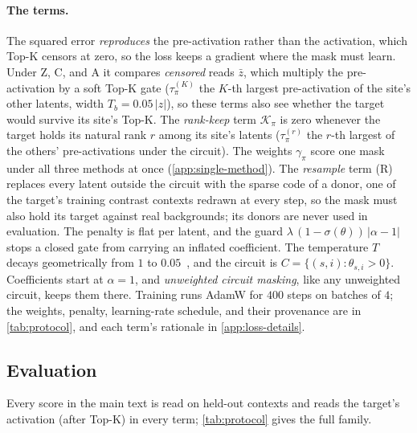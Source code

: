 \documentclass[10pt]{article}
\begin{document}
\paragraph{The terms.}
The squared error \emph{reproduces} the pre-activation rather than the activation, which Top-K censors at zero, so the loss keeps a gradient where the mask must learn.
Under Z, C, and A it compares \emph{censored} reads $\bar{z}$, which multiply the pre-activation by a soft Top-K gate ($\tau^{(K)}_{\pi}$ the $K$-th largest pre-activation of the site's other latents, width $T_b = 0.05\,\lvert z \rvert$), so these terms also see whether the target would survive its site's Top-K.
The \emph{rank-keep} term $\mathcal{K}_{\pi}$ is zero whenever the target holds its natural rank $r$ among its site's latents ($\tau^{(r)}_{\pi}$ the $r$-th largest of the others' pre-activations under the circuit).
The weights $\gamma_{\pi}$ score one mask under all three methods at once (\cref{app:single-method}).
The \emph{resample} term (R) replaces every latent outside the circuit with the sparse code of a donor, one of the target's training contrast contexts redrawn at every step, so the mask must also hold its target against real backgrounds; its donors are never used in evaluation.
The penalty is flat per latent, and the guard $\lambda\,(1 - \sigma(\theta))\,|\alpha - 1|$ stops a closed gate from carrying an inflated coefficient.
The temperature $T$ decays geometrically from $1$ to $0.05$~\citep{savarese2020winning}, and the circuit is $C = \{(s, i) : \theta_{s,i} > 0\}$.
Coefficients start at $\alpha = 1$, and \emph{unweighted circuit masking}, like any unweighted circuit, keeps them there.
Training runs AdamW for $400$ steps on batches of $4$; the weights, penalty, learning-rate schedule, and their provenance are in \cref{tab:protocol}, and each term's rationale in \cref{app:loss-details}.

\subsection{Evaluation}
\label{sec:eval}
\label{sec:eval-abl}

Every score in the main text is read on held-out contexts and reads the target's activation (after Top-K) in every term; \cref{tab:protocol} gives the full family.
\end{document}

